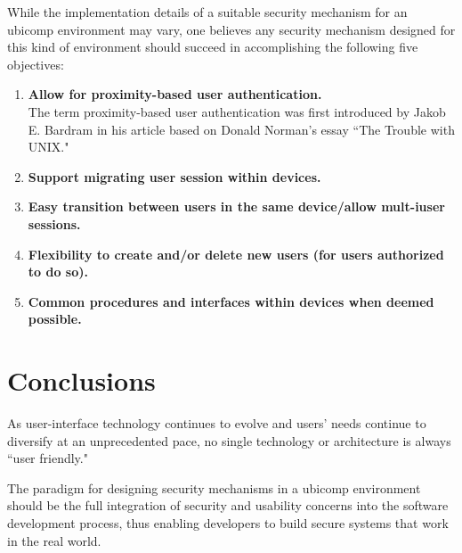 \documentclass{article}
\begin{document}
While the implementation details of a suitable security mechanism for an ubicomp environment may vary, one believes any security mechanism designed for this kind of environment should succeed in accomplishing the following five objectives:

\begin{enumerate}
 \item \textbf{Allow for proximity-based user authentication.}\\
 The term proximity-based user authentication was first introduced by Jakob E. Bardram \cite{bardram2005trouble} in his article based on Donald Norman's essay ``The Trouble with UNIX."\cite{norman1981trouble}
 
 \item \textbf{Support migrating user session within devices.}
 
 \item \textbf{Easy transition between users in the same device/allow mult-iuser sessions.}  
 
 \item \textbf{Flexibility to create and/or delete new users (for users authorized to do so).}
 
 \item \textbf{Common procedures and interfaces within devices when deemed possible.}
\end{enumerate}

\section{Conclusions}
As user-interface technology continues to evolve and users' needs continue to diversify at an unprecedented pace, no single technology or architecture is always ``user friendly." 

The paradigm for designing security mechanisms in a ubicomp environment should be the full integration of security and usability concerns into the software development process, thus enabling developers to build secure systems that work in the real world. \cite{flechais2003bringing}



\end{document}
